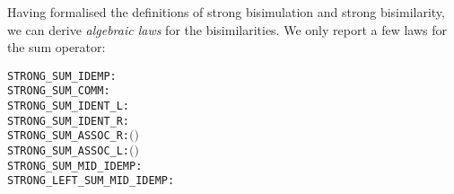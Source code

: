 Having formalised the definitions of strong bisimulation and strong bisimilarity,
we can derive  \emph{algebraic laws} for the 
 bisimilarities. We only report a few laws for the sum operator:
\begin{alltt}
STRONG_SUM_IDEMP:          \HOLTokenTurnstile{}  \HOLSymConst{\ensuremath{+}}  \HOLSymConst{\HOLTokenStrongEQ}   
STRONG_SUM_COMM:           \HOLTokenTurnstile{}  \HOLSymConst{\ensuremath{+}}  \HOLSymConst{\HOLTokenStrongEQ}  \HOLSymConst{\ensuremath{+}} 
STRONG_SUM_IDENT_L:        \HOLTokenTurnstile{}  \HOLSymConst{\ensuremath{+}}  \HOLSymConst{\HOLTokenStrongEQ} 
STRONG_SUM_IDENT_R:        \HOLTokenTurnstile{}  \HOLSymConst{\ensuremath{+}}  \HOLSymConst{\HOLTokenStrongEQ} 
STRONG_SUM_ASSOC_R:        \HOLTokenTurnstile{}  \HOLSymConst{\ensuremath{+}}  \HOLSymConst{\ensuremath{+}}  \HOLSymConst{\HOLTokenStrongEQ}  \HOLSymConst{\ensuremath{+}} \ensuremath{(} \HOLSymConst{\ensuremath{+}} \ensuremath{)}
STRONG_SUM_ASSOC_L:        \HOLTokenTurnstile{}  \HOLSymConst{\ensuremath{+}} \ensuremath{(} \HOLSymConst{\ensuremath{+}} \ensuremath{)} \HOLSymConst{\HOLTokenStrongEQ}  \HOLSymConst{\ensuremath{+}}  \HOLSymConst{\ensuremath{+}} 
STRONG_SUM_MID_IDEMP:      \HOLTokenTurnstile{}  \HOLSymConst{\ensuremath{+}}  \HOLSymConst{\ensuremath{+}}  \HOLSymConst{\HOLTokenStrongEQ}  \HOLSymConst{\ensuremath{+}} 
STRONG_LEFT_SUM_MID_IDEMP: \HOLTokenTurnstile{}  \HOLSymConst{\ensuremath{+}}  \HOLSymConst{\ensuremath{+}}  \HOLSymConst{\ensuremath{+}}  \HOLSymConst{\HOLTokenStrongEQ}  \HOLSymConst{\ensuremath{+}}  \HOLSymConst{\ensuremath{+}} 
\end{alltt}


